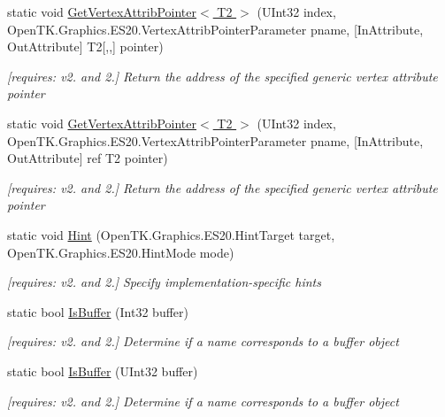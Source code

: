 \begin{DoxyCompactItemize}
static void \hyperlink{class_open_t_k_1_1_graphics_1_1_e_s20_1_1_g_l_a68d2e3704aa42f60492a1d2d0f2824de}{Get\-Vertex\-Attrib\-Pointer$<$ T2 $>$} (U\-Int32 index, Open\-T\-K.\-Graphics.\-E\-S20.\-Vertex\-Attrib\-Pointer\-Parameter pname, \mbox{[}In\-Attribute, Out\-Attribute\mbox{]} T2\mbox{[},,\mbox{]} pointer)
\begin{DoxyCompactList}\small\item\em \mbox{[}requires\-: v2. and 2.\mbox{]} Return the address of the specified generic vertex attribute pointer \end{DoxyCompactList}\item 
static void \hyperlink{class_open_t_k_1_1_graphics_1_1_e_s20_1_1_g_l_a29e2e768b794db23340f1c82a2747023}{Get\-Vertex\-Attrib\-Pointer$<$ T2 $>$} (U\-Int32 index, Open\-T\-K.\-Graphics.\-E\-S20.\-Vertex\-Attrib\-Pointer\-Parameter pname, \mbox{[}In\-Attribute, Out\-Attribute\mbox{]} ref T2 pointer)
\begin{DoxyCompactList}\small\item\em \mbox{[}requires\-: v2. and 2.\mbox{]} Return the address of the specified generic vertex attribute pointer \end{DoxyCompactList}\item 
static void \hyperlink{class_open_t_k_1_1_graphics_1_1_e_s20_1_1_g_l_a1b5065e9be751976040d1f92e613e9ae}{Hint} (Open\-T\-K.\-Graphics.\-E\-S20.\-Hint\-Target target, Open\-T\-K.\-Graphics.\-E\-S20.\-Hint\-Mode mode)
\begin{DoxyCompactList}\small\item\em \mbox{[}requires\-: v2. and 2.\mbox{]} Specify implementation-\/specific hints \end{DoxyCompactList}\item 
static bool \hyperlink{class_open_t_k_1_1_graphics_1_1_e_s20_1_1_g_l_a9b1cd72cffad3bcd99541595b1b61dd4}{Is\-Buffer} (Int32 buffer)
\begin{DoxyCompactList}\small\item\em \mbox{[}requires\-: v2. and 2.\mbox{]} Determine if a name corresponds to a buffer object \end{DoxyCompactList}\item 
static bool \hyperlink{class_open_t_k_1_1_graphics_1_1_e_s20_1_1_g_l_a2492cd230962bc18839b7c912426fc35}{Is\-Buffer} (U\-Int32 buffer)
\begin{DoxyCompactList}\small\item\em \mbox{[}requires\-: v2. and 2.\mbox{]} Determine if a name corresponds to a buffer object \end{DoxyCompactList}\item 

\end{DoxyCompactItemize}
